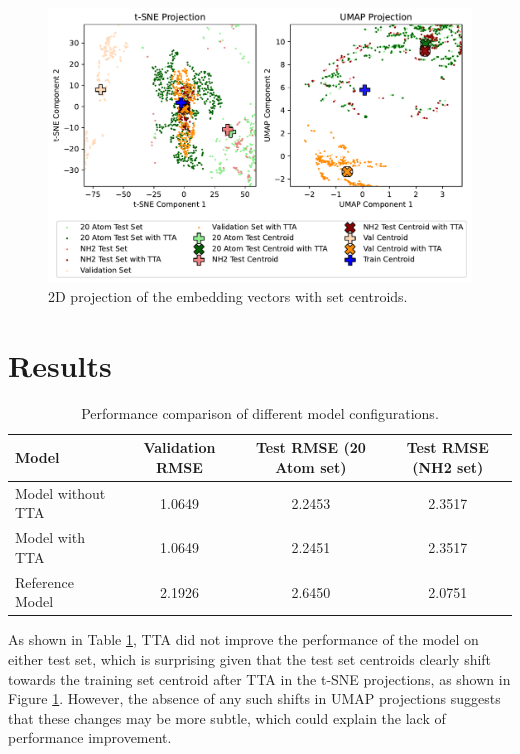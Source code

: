 \documentclass[11pt,a4paper]{article}
\begin{document}
\begin{figure}[htbp]
        \centering
        \includegraphics[width=1\textwidth]{sets_TTA.pdf}
        \caption{2D projection of the embedding vectors with set centroids.}
        \label{fig:sets_TTA}
\end{figure}

\section{Results}

\begin{table}[htbp]
        \centering
        \begin{tabular}{@{}lccc@{}}
                \toprule
                \textbf{Model}    & \textbf{Validation RMSE} & \textbf{Test RMSE (20 Atom set)} & \textbf{Test RMSE (NH2 set)} \\
                \midrule
                Model without TTA & 1.0649                   & 2.2453                           & 2.3517                       \\
                Model with TTA    & 1.0649                   & 2.2451                           & 2.3517                       \\
                Reference Model   & 2.1926                   & 2.6450                           & 2.0751                       \\
                \bottomrule
        \end{tabular}
        \caption{Performance comparison of different model configurations.}
        \label{tab:results}
\end{table}

As shown in Table \ref{tab:results}, TTA did not improve the performance of the model on either test set, which is surprising given that the test set centroids clearly shift towards the training set centroid after TTA in the t-SNE projections, as shown in Figure \ref{fig:sets_TTA}. However, the absence of any such shifts in UMAP projections suggests that these changes may be more subtle, which could explain the lack of performance improvement.
\end{document}
